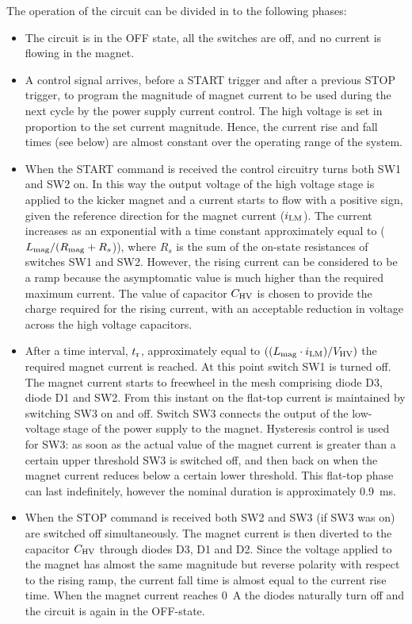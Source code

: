 \documentclass[aps,prab,twocolumn,superscriptaddress]{revtex4-1}
\begin{document}
The operation of the circuit can be divided in to the following phases:
\begin{itemize}[leftmargin=*]
	\item	The circuit is in the OFF state, all the switches are off, and no current is flowing in the magnet.
	\item	A control signal arrives, before a START trigger and after a previous STOP trigger, to program the magnitude of magnet current to be used during the next cycle by the power supply current control. The high voltage is set in proportion to the set current magnitude. Hence, the current rise and fall times  (see below) are almost constant over the operating range of the system.
	\item	When the START command is received the control circuitry turns both SW1 and SW2 on. In this way the output voltage of the high voltage stage is applied to the kicker magnet and a current starts to flow with a positive sign, given the reference direction for the magnet current (${i_{\rm{LM}}}$). The current increases as an exponential with a time constant approximately equal to (${L_{\rm{mag}}}/({R_{\rm{mag}}}+{R_{s}}$)), where ${R_{s}}$ is the sum of the  on-state resistances of switches SW1 and SW2. However, the rising current can be considered to be a ramp because the asymptomatic value is much higher than the required maximum current. The value of capacitor ${C_{\rm{HV}}}$ is chosen to provide the charge required for the rising current, with an acceptable reduction in voltage  across the high voltage capacitors.

	\item	After a time interval, $t_{\rm{r}}$, approximately equal to  $(({L_{\rm{mag}}}\cdot {i_{\rm{LM}}})/ {V_{\rm{HV}}})$ the required magnet current is reached. At this point switch SW1 is turned off. The magnet current starts to freewheel in the mesh comprising diode D3, diode D1 and SW2. From this instant on the flat-top current is maintained by switching SW3 on and off. Switch SW3 connects the output of the low-voltage stage of the power supply to the magnet. Hysteresis control is used for SW3: as soon as the actual value of the magnet current is greater than a certain upper threshold SW3 is switched off, and then back on when the magnet current reduces below a certain lower threshold. This flat-top phase can last indefinitely, however the nominal duration is approximately 0.9~ms.

	\item	When the STOP command is received both SW2 and SW3 (if SW3 was on) are switched off simultaneously. The magnet current is then diverted to the capacitor $C_{\rm{HV}}$ through diodes D3, D1 and D2. Since the voltage applied to the magnet has almost the same magnitude but reverse polarity with respect to the rising ramp, the current fall time is almost equal to the current rise time. When the magnet current reaches 0~A the diodes naturally turn off and the circuit is again in the OFF-state.
\end{itemize}
\end{document}
